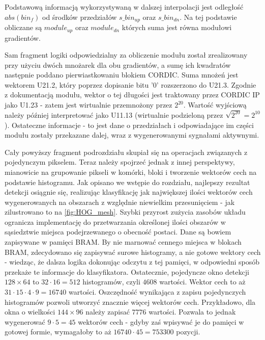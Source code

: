 Podstawową informacją wykorzystywaną w dalszej interpolacji jest odległość $abs(bin_f)$ od środków przedziałów $s\_bin_{up}$ oraz $s\_bin_{dn}$. Na tej podstawie obliczane są $module_{up}$ oraz $module_{dn}$ których suma jest równa modułowi gradientów.

Sam fragment logiki odpowiedzialny za obliczenie modułu został zrealizowany przy użyciu dwóch mnożarek dla obu gradientów, a sumę ich kwadratów następnie poddano pierwiastkowaniu blokiem CORDIC. Suma mnożeń jest wektorem U21.2, który poprzez dopisanie bitu '0' rozszerzono do U21.3. Zgodnie z dokumentacją modułu, wektor o tej długości jest traktowany przez CORDIC IP jako U1.23 - zatem jest wirtualnie przemnożony przez $2^{20}$. Wartość wyjściową należy później interpretować jako U11.13 (wirtualnie podzieloną przez $\sqrt{2^{20}}=2^{10}$). \newline
Ostateczne informacje - to jest dane o przedziałach i odpowiadające im części modułu zostały przekazane dalej, wraz z wygenerowanymi sygnałami aktywnymi.

Cały powyższy fragment podrozdziału skupiał się na operacjach związanych z pojedynczym pikselem. Teraz należy spojrzeć jednak z innej perspektywy, mianowicie na grupowanie pikseli w komórki, bloki i tworzenie wektorów cech na podstawie histogramu. \newline
Jak opisano we wstępie do rozdziału, najlepszy rezultat detekcji osiągnie się, realizując klasyfikację jak największej ilości wektorów cech wygenerowanych na obszarach z względnie niewielkim przesunięciem - jak zilustrowano to na \ref{fig:HOG_mesh}. Szybki przyrost zużycia zasobów układu ogranicza implementację do przetwarzania określonej ilości obszarów w sąsiedztwie miejsca podejrzewanego o obecność postaci.
Dane są bowiem zapisywane w pamięci BRAM. By nie marnować cennego miejsca w blokach BRAM, zdecydowano się zapisywać surowe histogramy, a nie gotowe wektory cech - wiedząc, że dalsza logika dokonując odczytu z tej pamięci, w odpowiedni sposób przekaże te informacje do klasyfikatora. Ostatecznie, pojedyncze okno detekcji $128\times 64$ to $32\cdot16=512$ histogramów, czyli $4608$ wartości. Wektor cech to aż $31\cdot15\cdot4\cdot9=16740$ wartości. Oszczędność wynikająca z zapisu pojedynczych histogramów pozwoli utworzyć znacznie więcej wektorów cech. Przykładowo, dla okna o wielkości $144\times 96$ należy zapisać $7776$ wartości. Pozwala to jednak wygenerować $9\cdot5=45$ wektorów cech - gdyby zaś wpisywać je do pamięci w gotowej formie, wymagałoby to aż $16740\cdot45=753300$ pozycji.

